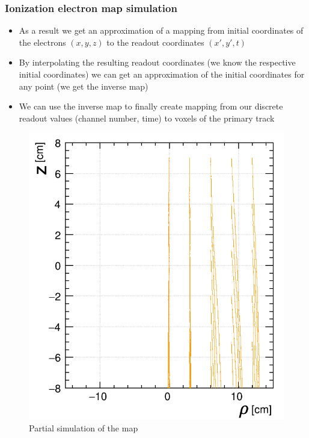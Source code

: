 \documentclass{beamer}
\begin{document}
	\begin{frame}
		\frametitle{Ionization electron map simulation}
		\begin{itemize}
			\item As a result we get an approximation of a mapping from initial coordinates of the electrons $(x,y,z)$ to the readout coordinates $(x',y',t)$
			\item By interpolating the resulting readout coordinates (we know the respective initial coordinates) we can get an approximation of the initial coordinates for any point (we get the inverse map)
			\item We can use the inverse map to finally create mapping from our discrete readout values (channel number, time) to voxels of the primary track
		\end{itemize}
		\begin{figure}
			\centering
			\includegraphics[height=0.4\textheight]{../images/map_lines.png}
			\caption{Partial simulation of the map}
		\end{figure}
	\end{frame}
\end{document}
